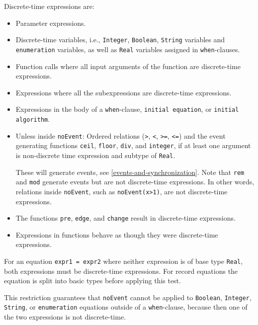 Discrete-time expressions are:
\begin{itemize}
\item
  Parameter expressions.
\item
  Discrete-time variables, i.e., \lstinline!Integer!, \lstinline!Boolean!, \lstinline!String! variables and \lstinline!enumeration! variables, as well as \lstinline!Real! variables assigned in \lstinline!when!-clauses.
\item
  Function calls where all input arguments of the function are discrete-time expressions.
\item
  Expressions where all the subexpressions are discrete-time expressions.
\item
  Expressions in the body of a \lstinline!when!-clause, \lstinline!initial equation!, or \lstinline!initial algorithm!.
\item
  Unless inside \lstinline!noEvent!: Ordered relations (\lstinline!>!, \lstinline!<!, \lstinline!>=!, \lstinline!<=!) and the event generating functions \lstinline!ceil!, \lstinline!floor!, \lstinline!div!, and \lstinline!integer!, if at least one argument is non-discrete time expression and subtype of \lstinline!Real!.
  \begin{nonnormative}
  These will generate events, see \cref{events-and-synchronization}.  Note that \lstinline!rem! and \lstinline!mod! generate events but are not discrete-time expressions.  In other words, relations inside \lstinline!noEvent!, such as \lstinline!noEvent(x>1)!, are not discrete-time expressions.
  \end{nonnormative}
\item
  The functions \lstinline!pre!, \lstinline!edge!, and \lstinline!change! result in discrete-time expressions.
\item
  Expressions in functions behave as though they were discrete-time expressions.
\end{itemize}

For an equation \lstinline!expr1 = expr2! where neither expression is of base type
\lstinline!Real!, both expressions must be discrete-time expressions. For record
equations the equation is split into basic types before applying this
test.

\begin{nonnormative}
This restriction guarantees that \lstinline!noEvent! cannot be applied to \lstinline!Boolean!, \lstinline!Integer!, \lstinline!String!, or \lstinline!enumeration!
equations outside of a \lstinline!when!-clause, because then one of the two expressions is not discrete-time.
\end{nonnormative}

